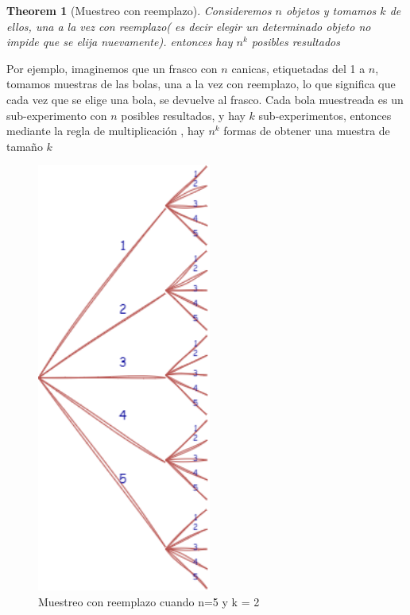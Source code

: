 \documentclass[
]{book}
\newtheorem{theorem}{Theorem}[chapter]
\theoremstyle{definition}
\theoremstyle{definition}
\theoremstyle{definition}
\theoremstyle{definition}
\theoremstyle{remark}
\begin{document}
\begin{theorem}[Muestreo con reemplazo]
\protect\hypertarget{thm:muestreoconreemplazo}{}\label{thm:muestreoconreemplazo}Consideremos \(n\) objetos y tomamos \(k\) de ellos, una a la vez con reemplazo( es decir elegir un determinado objeto no impide que se elija nuevamente). entonces hay \(n^k\) posibles resultados
\end{theorem}

Por ejemplo, imaginemos que un frasco con \(n\) canicas, etiquetadas del 1 a \(n\), tomamos muestras de las bolas, una a la vez con reemplazo, lo que significa que cada vez que se elige una bola, se devuelve al frasco. Cada bola muestreada es un sub-experimento con \(n\) posibles resultados, y hay \(k\) sub-experimentos, entonces mediante la regla de multiplicación , hay \(n^k\) formas de obtener una muestra de tamaño \(k\)

\begin{figure}

{\centering \includegraphics[width=2.25in]{./images/muestreoconreemplazo.drawio} 

}

\caption{Muestreo con reemplazo cuando n=5 y k = 2}\label{fig:unnamed-chunk-5}
\end{figure}
\end{document}
